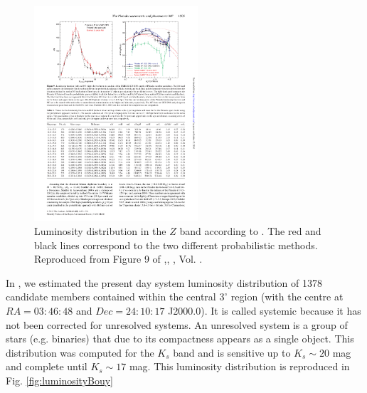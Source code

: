\begin{figure}[ht!]
\begin{center}
\includegraphics[height=8cm]{background/Figures/F9_Lodieu2012.pdf}
\caption{Luminosity distribution  in the $Z$ band according to \citet{Lodieu2012}. The red and black lines correspond to the two different probabilistic methods.  Reproduced from Figure 9 of \citet{Lodieu2012},\textit{}, , Vol. .}
\label{fig:luminosityLodieu}
\end{center}
\end{figure}

In \citet{Bouy2015},  we estimated the present day system luminosity distribution of 1378 candidate members contained within the central $3^{\circ}$ region (with the centre at $RA=03:46:48$ and $Dec=24:10:17$ J2000.0). It is called systemic because it has not been corrected for unresolved systems. An unresolved system is a group of stars (e.g. binaries) that due to its compactness appears as a single object. This distribution was computed for the $K_s$ band and is sensitive up to $K_s \sim 20$ mag and complete until $K_s \sim 17$ mag. This luminosity distribution is reproduced in Fig. \ref{fig:luminosityBouy}


